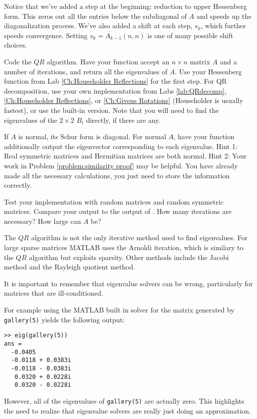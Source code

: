 Notice that we've added a step at the beginning: reduction to upper Hessenberg form. This zeros out all the entries below the subdiagonal of $A$ and speeds up the diagonalization process. We've also added a shift at each step, $s_k$, which further speeds convergence. Setting $s_k = A_{k-1}(n,n)$ is one of many possible shift choices.

\begin{problem}
Code the $QR$ algorithm. Have your function accept an $n \times n$ matrix $A$ and a number of iterations, and return all the eigenvalues of $A$. Use your Hessenberg function from Lab \ref{Ch:Householder Reflections} for the first step. For QR decomposition, use your own implementation from Labs \ref{lab:QRdecomp}, \ref{Ch:Householder Reflections}, or \ref{Ch:Givens Rotations} (Householder is usually fastest), or use the built-in version. Note that you will need to find the eigenvalues of the $2 \times 2$ $B_i$ directly, if there are any.
\end{problem}

\begin{problem}
If $A$ is normal, its Schur form is diagonal. For normal $A$, have your function additionally output the eigenvector corresponding to each eigenvalue. Hint 1: Real symmetric matrices and Hermitian matrices are both normal. Hint 2: Your work in Problem \ref{problem:similarity proof} may be helpful. You have already made all the necessary calculations, you just need to store the information correctly.
\end{problem}

\begin{problem}
Test your implementation with random matrices and random symmetric matrices. Compare your output to the output of . How many iterations are necessary? How large can $A$ be?
\end{problem}

The $QR$ algorithm is not the only iterative method used to find eigenvalues. For large sparse matrices MATLAB uses the Arnoldi iteration, which is similary to the $QR$ algorithm but exploits sparsity. Other methods include the Jacobi method and the Rayleigh quotient method.

It is important to remember that eigenvalue solvers can be wrong, particularly for matrices that are ill-conditioned. 
\begin{matlab}
For example using the MATLAB built in solver for the matrix generated by {\tt gallery(5)} yields the following output:
\begin{lstlisting}[style=matlab]
>> eig(gallery(5))
ans =
  -0.0405          
  -0.0118 + 0.0383i
  -0.0118 - 0.0383i
   0.0320 + 0.0228i
   0.0320 - 0.0228i
\end{lstlisting}

However, all of the eigenvalues of {\tt gallery(5)} are actually zero. This highlights the need to realize that eigenvalue solvers are really just doing an approximation.
\end{matlab}
